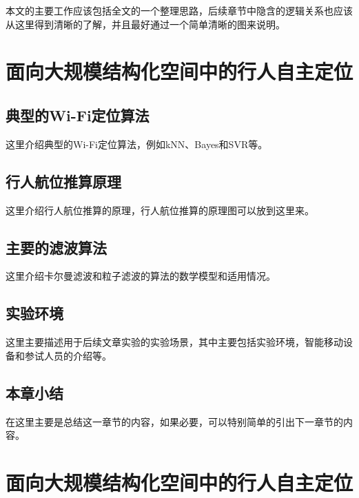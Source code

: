 本文的主要工作应该包括全文的一个整理思路，后续章节中隐含的逻辑关系也应该从这里得到清晰的了解，并且最好通过一个简单清晰的图来说明。




\chapter{面向大规模结构化空间中的行人自主定位}

\section{典型的Wi-Fi定位算法}

这里介绍典型的Wi-Fi定位算法，例如kNN、Bayes和SVR等。

\section{行人航位推算原理}

这里介绍行人航位推算的原理，行人航位推算的原理图可以放到这里来。

\section{主要的滤波算法}

这里介绍卡尔曼滤波和粒子滤波的算法的数学模型和适用情况。

\section{实验环境}

这里主要描述用于后续文章实验的实验场景，其中主要包括实验环境，智能移动设备和参试人员的介绍等。

\section{本章小结}

在这里主要是总结这一章节的内容，如果必要，可以特别简单的引出下一章节的内容。




\chapter{面向大规模结构化空间中的行人自主定位}

